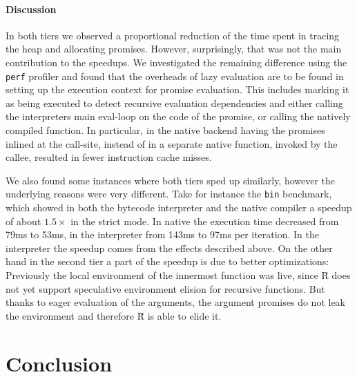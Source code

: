 \documentclass[review,nonacm,screen,acmsmall,anonymous=true]{acmart}
\renewcommand{\Rsh}{{\sf\u R}\xspace}
\begin{document}
\paragraph{Discussion}

In both tiers we observed a proportional reduction of the time spent in tracing
the heap and allocating promises.
However, surprisingly, that was not the main contribution to the speedups.
We investigated the remaining difference using the \lstinline{perf} profiler
and found that the overheads of lazy evaluation are to be found in setting up the
execution context for promise evaluation. This includes marking it as being
executed to detect recursive evaluation dependencies and either calling the interpreters
main eval-loop on the code of the promise, or calling the natively compiled
function. In particular, in the native backend having the promises inlined at the
call-site, instead of in a separate native function, invoked by the callee,
resulted in fewer instruction cache misses.

We also found some instances where both tiers sped up similarly,
however the underlying reasons were very different.
Take for instance the \lstinline{bin} benchmark, which showed in both
the bytecode interpreter and the native compiler a speedup of about $1.5\times$
in the strict mode. In native the execution time decreased from 79ms to 53ms, in
the interpreter from 143ms to 97ms per iteration. In the interpreter the speedup
comes from the effects described above. On the other hand in the second tier
a part of the speedup is due to better optimizations: Previously the local
environment of the innermost function was live, since \Rsh does not yet
support speculative environment elision for recursive functions. But thanks to eager
evaluation of the arguments, the argument promises do not leak the environment
and therefore \Rsh is able to elide it.

\section{Conclusion}\label{sec:conclusion}





\end{document}
